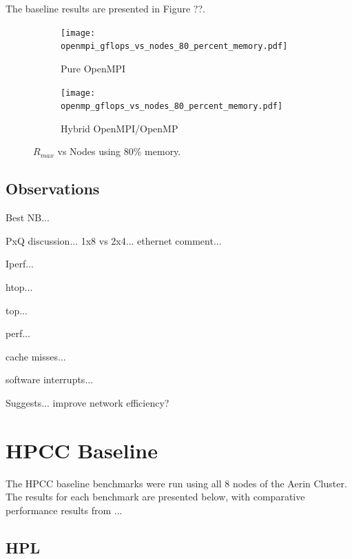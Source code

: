\documentclass{report}
\begin{document}
The baseline results are presented in Figure ??.

\begin{figure}[H]
	\begin{subfigure}{1.0\textwidth}
		\centering
		\texttt{[image: openmpi\_gflops\_vs\_nodes\_80\_percent\_memory.pdf]}
		\caption{Pure OpenMPI}
		\label{fig:subim1}
	\end{subfigure}
	\par\bigskip
	\begin{subfigure}{1.0\textwidth}
		\centering
		\texttt{[image: openmp\_gflops\_vs\_nodes\_80\_percent\_memory.pdf]}
		\caption{Hybrid OpenMPI/OpenMP}
		\label{fig:subim2}
	\end{subfigure}
\caption{$R_{max}$ vs Nodes using 80\% memory.}
\label{fig:image2}
\end{figure}


%
%
\subsection{Observations}

Best NB...

PxQ discussion... 1x8 vs 2x4... ethernet comment...

Iperf...

htop...

top...

perf...

cache misses...

software interrupts...

Suggests... improve network efficiency?



%
%
\section{HPCC Baseline}

The HPCC baseline benchmarks were run using all 8 nodes of the Aerin Cluster. The results for each benchmark are presented below, with comparative performance results from ...


%
%
\subsection{HPL}
\end{document}
